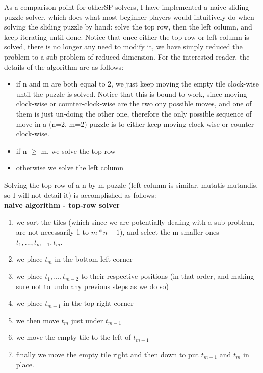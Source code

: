 As a comparison point for otherSP solvers, I have implemented a naive sliding puzzle solver, which does what most beginner players would intuitively do when solving the sliding puzzle by hand: solve the top row, then the left column, and keep iterating until done. Notice that once either the top row or left column is solved, there is no longer any need to modify it, we have simply reduced the problem to a sub-problem of reduced dimension. For the interested reader, the details of the algorithm are as follows:
\begin{itemize}
\item if n and m are both equal to 2, we just keep moving the empty tile clock-wise until the puzzle is solved. Notice that this is bound to work, since moving clock-wise or counter-clock-wise are the two ony possible moves, and one of them is just un-doing the other one, therefore the only possible sequence of move in a (n=2, m=2) puzzle is to either keep moving clock-wise or counter-clock-wise.
\item if n $\geq$ m, we solve the top row
\item otherwise we solve the left column
\end{itemize}
Solving the top row of a n by m puzzle (left column is similar, mutatis mutandis, so I will not detail it) is accomplished as follows:
\\
\textbf{naive algorithm - top-row solver}
\begin{enumerate}
\item \label{s1} we sort the tiles (which since we are potentially dealing with a sub-problem, are not necessarily 1 to $m* n - 1$), and select the m smaller ones $t_{1}, ..., t_{m-1}, t_{m}$.
\item \label{s2} we place $t_{m}$ in the bottom-left corner
\item \label{s3} we place $t_{1}, ..., t_{m-2}$ to their respective positions (in that order, and making sure not to undo any previous steps as we do so)
\item \label{s4} we place $t_{m-1}$ in the top-right corner
\item \label{s5} we then move $t_{m}$ just under $t_{m-1}$
\item \label{s6} we move the empty tile to the left of $t_{m-1}$
\item \label{s7} finally we move the empty tile right and then down to put $t_{m-1}$ and $t_{m}$ in place.
\end{enumerate}
